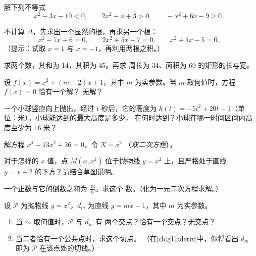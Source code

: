 \begin{exercise}[$\star$]\label{exo:g11:quad:3}
解下列不等式
\[
x^2 - 3x - 10 < 0, \qquad
2x^2 + x + 3 > 0, \qquad
-x^2 + 6x - 9 \geq 0 .
\]
\end{exercise}

\begin{exercise}[$\star$]\label{exo:g11:quad:4}
不计算 $\Delta$，先求出一个显然的根，再求另一个根：
\[
x^2 - 7x + 6 = 0, \qquad
2x^2 + 5x - 7 = 0, \qquad
x^2 + 4x - 5 = 0 .
\]
（提示：试取 $x = 1$ 与 $x = -1$，再利用两根之积。）
\end{exercise}

\begin{exercise}[$\star\star$]\label{exo:g11:quad:5}
求两个数，其和为 $14$，其积为 $45$。再求
周长为 $34$、面积为 $60$ 的矩形的长与宽。
\end{exercise}

\begin{exercise}[$\star\star$]\label{exo:g11:quad:6}
设 $f(x) = x^2 + (m-2)x + 1$，其中 $m$ 为实参数。当
$m$ 取何值时，方程 $f(x) = 0$ 恰有一个解？
无解？
\end{exercise}

\begin{exercise}[$\star\star$]\label{exo:g11:quad:7}
一个小球竖直向上抛出，经过 $t$ 秒后，它的高度为
$h(t) = -5t^2 + 20t + 1$（单位：米）。小球能达到的最大高度是多少，
在何时达到？小球在哪一时间区间内高度至少为
$16$ 米？
\end{exercise}

\begin{exercise}[$\star\star$]\label{exo:g11:quad:8}
解方程 $x^4 - 13x^2 + 36 = 0$，令 $X = x^2$
（\emph{双二次方程}）。
\end{exercise}

\begin{exercise}[$\star\star$]\label{exo:g11:quad:9}
对于怎样的 $x$ 值，点 $M(x, x^2)$ 位于抛物线 $y = x^2$
上，且严格处于直线 $y = x + 2$ 的下方？请结合草图说明。
\end{exercise}

\begin{exercise}[$\star\star$]\label{exo:g11:quad:10}
一个正数与它的倒数之和为 $\frac{13}{6}$。求这个
数。（化为一元二次方程求解。）
\end{exercise}

\begin{exercise}[$\star\star\star$]\label{exo:g11:quad:11}
设 $\mathcal P$ 为抛物线 $y = x^2$，$d_m$ 为直线
$y = mx - 1$，其中 $m$ 为实参数。
\begin{enumerate}
  \item 当 $m$ 取何值时，$\mathcal P$ 与 $d_m$ 有
        两个交点？恰有一个交点？无交点？
  \item 当二者恰有一个公共点时，求这个切点。
        （在\cref{ch:g11:deriv}中，你将看出 $d_m$ 即为
        $\mathcal P$ 在该点处的切线。）
\end{enumerate}
\end{exercise}

